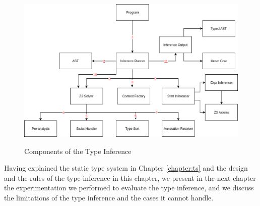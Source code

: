 \begin{figure}
	\centering
	\begin{mdframed}
		\centering
		\includegraphics[width=130mm]{images/TI_comp.eps}\\
	\end{mdframed}
	\caption{Components of the Type Inference}
	\label{fig:ti_comp}
\end{figure}

Having explained the static type system in Chapter \ref{chapter:ts} and the design and the rules of the type inference in this chapter, we present in the next chapter the experimentation we performed to evaluate the type inference, and we discuss the limitations of the type inference and the cases it cannot handle.